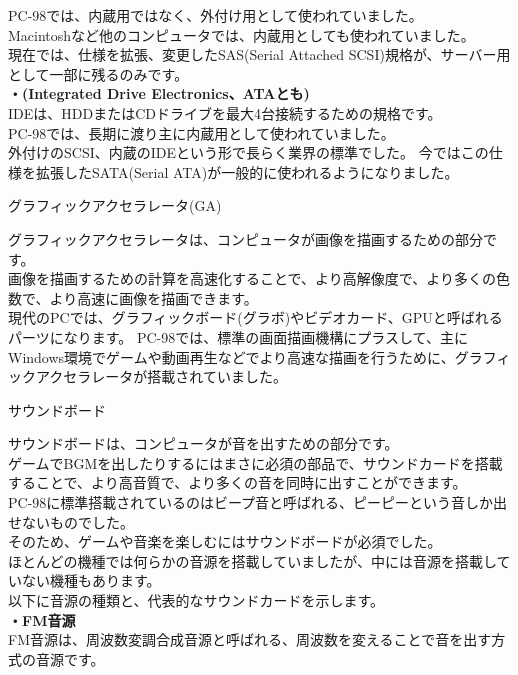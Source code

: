 \documentclass[b5paper,9pt,platex,dvipdfmx]{jsarticle}
\begin{document}
\begin{multicols*}{3}
\begin{enumerate}
  PC-98では、内蔵用ではなく、外付け用として使われていました。\\
  Macintoshなど他のコンピュータでは、内蔵用としても使われていました。\\
  現在では、仕様を拡張、変更したSAS(Serial Attached SCSI)規格が、サーバー用として一部に残るのみです。\\
  {\bf・(Integrated Drive Electronics、ATAとも)\\}
  IDEは、HDDまたはCDドライブを最大4台接続するための規格です。\\
  PC-98では、長期に渡り主に内蔵用として使われていました。\\
  外付けのSCSI、内蔵のIDEという形で長らく業界の標準でした。
  今ではこの仕様を拡張したSATA(Serial ATA)が一般的に使われるようになりました。\\
  {\bf  \item グラフィックアクセラレータ(GA)\\}
  グラフィックアクセラレータは、コンピュータが画像を描画するための部分です。\\
  画像を描画するための計算を高速化することで、より高解像度で、より多くの色数で、より高速に画像を描画できます。\\
  現代のPCでは、グラフィックボード(グラボ)やビデオカード、GPUと呼ばれるパーツになります。
  PC-98では、標準の画面描画機構にプラスして、主にWindows環境でゲームや動画再生などでより高速な描画を行うために、グラフィックアクセラレータが搭載されていました。\\
  {\bf  \item サウンドボード\\}
  サウンドボードは、コンピュータが音を出すための部分です。\\
  ゲームでBGMを出したりするにはまさに必須の部品で、サウンドカードを搭載することで、より高音質で、より多くの音を同時に出すことができます。\\
  PC-98に標準搭載されているのはビープ音と呼ばれる、ピーピーという音しか出せないものでした。\\
  そのため、ゲームや音楽を楽しむにはサウンドボードが必須でした。\\
  ほとんどの機種では何らかの音源を搭載していましたが、中には音源を搭載していない機種もあります。\\
  以下に音源の種類と、代表的なサウンドカードを示します。\\
  {\bf ・FM音源 \\}
  FM音源は、周波数変調合成音源と呼ばれる、周波数を変えることで音を出す方式の音源です。\\

\end{enumerate}
\end{multicols*}
\end{document}
